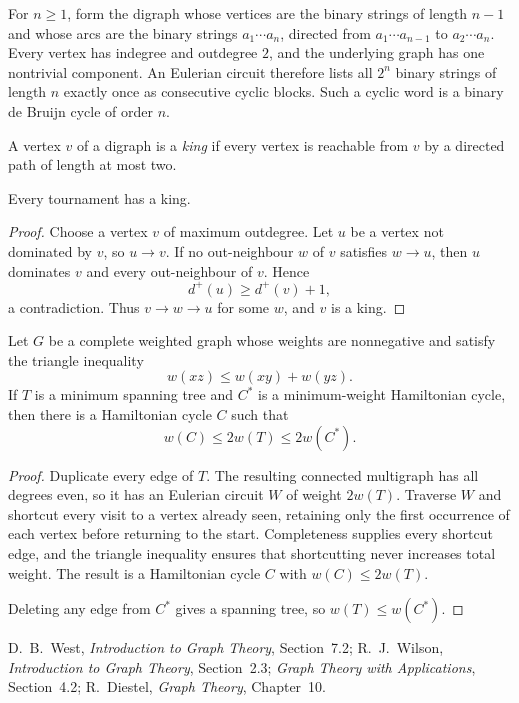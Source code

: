 \begin{noteapplication}
For $n\ge1$, form the digraph whose vertices are the binary strings of length $n-1$ and whose arcs are the binary strings $a_1\cdots a_n$, directed from $a_1\cdots a_{n-1}$ to $a_2\cdots a_n$.  Every vertex has indegree and outdegree $2$, and the underlying graph has one nontrivial component.  An Eulerian circuit therefore lists all $2^n$ binary strings of length $n$ exactly once as consecutive cyclic blocks.  Such a cyclic word is a binary de Bruijn cycle of order $n$.
\end{noteapplication}
\begin{notedefinition}[King]
A vertex $v$ of a digraph is a \emph{king} if every vertex is reachable from $v$ by a directed path of length at most two.
\end{notedefinition}

\begin{noteproposition}[Landau]
Every tournament has a king.
\end{noteproposition}
\begin{proof}
Choose a vertex $v$ of maximum outdegree.  Let $u$ be a vertex not dominated by $v$, so $u\to v$.  If no out-neighbour $w$ of $v$ satisfies $w\to u$, then $u$ dominates $v$ and every out-neighbour of $v$.  Hence
\[
  d^+(u)\ge d^+(v)+1,
\]
a contradiction.  Thus $v\to w\to u$ for some $w$, and $v$ is a king.
\end{proof}
\begin{notetheorem}
Let $G$ be a complete weighted graph whose weights are nonnegative and satisfy the triangle inequality
\[
  w(xz)\le w(xy)+w(yz).
\]
If $T$ is a minimum spanning tree and $C^*$ is a minimum-weight Hamiltonian cycle, then there is a Hamiltonian cycle $C$ such that
\[
  w(C)\le2w(T)\le2w(C^*).
\]
\end{notetheorem}
\begin{proof}
Duplicate every edge of $T$.  The resulting connected multigraph has all degrees even, so it has an Eulerian circuit $W$ of weight $2w(T)$.  Traverse $W$ and shortcut every visit to a vertex already seen, retaining only the first occurrence of each vertex before returning to the start.  Completeness supplies every shortcut edge, and the triangle inequality ensures that shortcutting never increases total weight.  The result is a Hamiltonian cycle $C$ with $w(C)\le2w(T)$.

Deleting any edge from $C^*$ gives a spanning tree, so $w(T)\le w(C^*)$.
\end{proof}
\begin{noteremark}
D.~B.~West, \emph{Introduction to Graph Theory}, Section~7.2; R.~J.~Wilson, \emph{Introduction to Graph Theory}, Section~2.3; \emph{Graph Theory with Applications}, Section~4.2; R.~Diestel, \emph{Graph Theory}, Chapter~10.
\end{noteremark}
